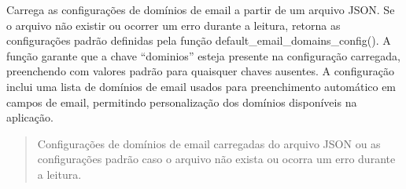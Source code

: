 \documentclass[letterpaper,10pt,english]{sphinxmanual}
\begin{document}
\begin{fulllineitems}
\label{\detokenize{api/config:config.load_email_domains_config}}
\pysigstartsignatures
\pysiglinewithargsret
{}
{}
{}
\pysigstopsignatures
\sphinxAtStartPar
Carrega as configurações de domínios de email a partir de um arquivo JSON. Se o arquivo não existir ou ocorrer um erro durante a leitura, retorna as configurações padrão definidas pela função default\_email\_domains\_config(). A função garante que a chave “dominios” esteja presente na configuração carregada, preenchendo com valores padrão para quaisquer chaves ausentes. A configuração inclui uma lista de domínios de email usados para preenchimento automático em campos de email, permitindo personalização dos domínios disponíveis na aplicação.
\begin{quote}\begin{description}
\sphinxAtStartPar
Configurações de domínios de email carregadas do arquivo JSON ou as configurações padrão caso o arquivo não exista ou ocorra um erro durante a leitura.

\sphinxAtStartPar
{}

\end{description}\end{quote}

\end{fulllineitems}

\end{document}
